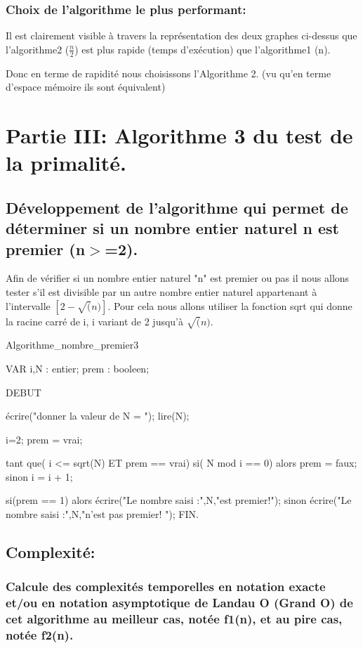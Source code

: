 \documentclass[12pt]{article}
\begin{document}
\subsubsection{Choix de l'algorithme le plus performant:}
Il est clairement visible à travers la représentation des deux graphes ci-dessus que l'algorithme2 ($\frac{n}{2}$) est plus rapide (temps d'exécution) que l'algorithme1 (n).

Donc en terme de rapidité nous choisissons l'Algorithme 2.
(vu qu'en terme d'espace mémoire ils sont équivalent)

\section{Partie III: Algorithme 3 du test de la primalité.}

\subsection{Développement de l'algorithme qui permet de déterminer  si un nombre entier naturel n est premier (n$>$=2). }
Afin de vérifier si un nombre entier naturel "n" est premier ou pas il nous allons tester s'il est divisible par un autre nombre entier naturel appartenant à l'intervalle $[2 - \sqrt(n)]$.
Pour cela nous allons utiliser la fonction sqrt qui donne la racine carré de i, i variant de 2 jusqu'à $\sqrt(n)$.


\begin{sql}

 Algorithme_nombre_premier3

 VAR
 i,N : entier;
 prem : booleen;
 
 DEBUT
 
	écrire("donner la valeur de N = ");
	lire(N);

	i=2;
	prem = vrai;

	tant que( i <= sqrt(N) ET prem == vrai){
		si( N mod i == 0)
			alors 
				prem = faux;				
			sinon
				i = i + 1;
	}

	si(prem == 1)
    	alors
        	écrire("Le nombre saisi :",N,"est premier!");
    	sinon
        	écrire("Le nombre saisi :",N,"n'est pas premier! ");
 FIN. 
\end{sql}

\subsection{Complexité:}

\subsubsection{Calcule des complexités temporelles en notation exacte et/ou en notation asymptotique de Landau O (Grand O) de  cet  algorithme au meilleur cas, notée f1(n), et au pire cas, notée f2(n). }
\end{document}
